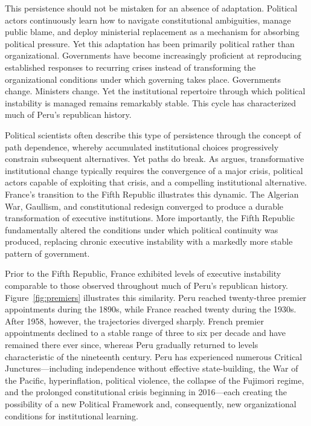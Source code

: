 \documentclass[doc, 12pt, a4paper,floatsintext]{apa7}
\begin{document}
This persistence should not be mistaken for an absence of adaptation. Political actors continuously learn how to navigate constitutional ambiguities, manage public blame, and deploy ministerial replacement as a mechanism for absorbing political pressure. Yet this adaptation has been primarily political rather than organizational. Governments have become increasingly proficient at reproducing established responses to recurring crises instead of transforming the organizational conditions under which governing takes place. Governments change. Ministers change. Yet the institutional repertoire through which political instability is managed remains remarkably stable. This cycle has characterized much of Peru's republican history.

Political scientists often describe this type of persistence through the concept of path dependence, whereby accumulated institutional choices progressively constrain subsequent alternatives. Yet paths do break. As \textcite{krznaric_how_2024} argues, transformative institutional change typically requires the convergence of a major crisis, political actors capable of exploiting that crisis, and a compelling institutional alternative. France's transition to the Fifth Republic illustrates this dynamic. The Algerian War, Gaullism, and constitutional redesign converged to produce a durable transformation of executive institutions. More importantly, the Fifth Republic fundamentally altered the conditions under which political continuity was produced, replacing chronic executive instability with a markedly more stable pattern of government.

Prior to the Fifth Republic, France exhibited levels of executive instability comparable to those observed throughout much of Peru's republican history. Figure~\ref{fig:premiers} illustrates this similarity. Peru reached twenty-three premier appointments during the 1890s, while France reached twenty during the 1930s. After 1958, however, the trajectories diverged sharply. French premier appointments declined to a stable range of three to six per decade and have remained there ever since, whereas Peru gradually returned to levels characteristic of the nineteenth century. Peru has experienced numerous Critical Junctures---including independence without effective state-building, the War of the Pacific, hyperinflation, political violence, the collapse of the Fujimori regime, and the prolonged constitutional crisis beginning in 2016---each creating the possibility of a new Political Framework and, consequently, new organizational conditions for institutional learning.
\end{document}
